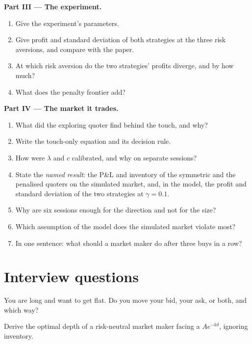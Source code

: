 \begin{problem}
\medskip\noindent\textbf{Part III --- The experiment.}
\begin{enumerate}[resume]
\item Give the experiment's parameters.
\item Give profit and standard deviation of both strategies at the three risk aversions, and compare with the paper.
\item At which risk aversion do the two strategies' profits diverge, and by how much?
\item What does the penalty frontier add?
\end{enumerate}

\medskip\noindent\textbf{Part IV --- The market it trades.}
\begin{enumerate}[resume]
\item What did the exploring quoter find behind the touch, and why?
\item Write the touch-only equation and its decision rule.
\item How were $\lambda$ and $c$ calibrated, and why on separate sessions?
\item State the \emph{named result}: the P\&L and inventory of the symmetric and the penalised quoters on the simulated market, and, in the model, the
profit and standard deviation of the two strategies at $\gamma=0.1$.
\item Why are six sessions enough for the direction and not for the size?
\item Which assumption of the model does the simulated market violate most?
\item In one sentence: what should a market maker do after three buys in a row?
\end{enumerate}
\end{problem}

\section{Interview questions}

\begin{interviewq}\label{iq:hf:inventory-models:1}
You are long and want to get flat. Do you move your bid, your ask, or both, and which way?
\end{interviewq}

\begin{interviewq}\label{iq:hf:inventory-models:2}
Derive the optimal depth of a risk-neutral market maker facing a  $Ae^{-k\delta}$, ignoring inventory.
\end{interviewq}

